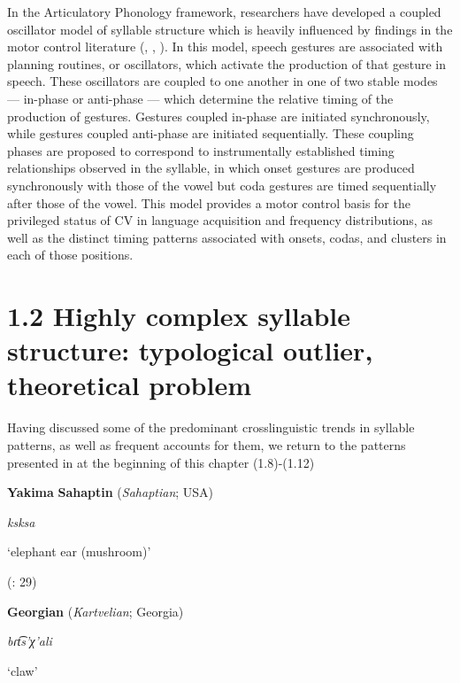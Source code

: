   In the Articulatory Phonology framework, researchers have developed a coupled oscillator model of syllable structure which is heavily influenced by findings in the motor control literature (\citealt{NamSaltzman2003}, \citealt{GoldsteinEtAl2006}, \citealt{NamEtAl2009}). In this model, speech gestures are associated with planning routines, or oscillators, which activate the production of that gesture in speech. These oscillators are coupled to one another in one of two stable modes — in-phase or anti-phase — which determine the relative timing of the production of gestures. Gestures coupled in-phase are initiated synchronously, while gestures coupled anti-phase are initiated sequentially. These coupling phases are proposed to correspond to instrumentally established timing relationships observed in the syllable, in which onset gestures are produced synchronously with those of the vowel but coda gestures are timed sequentially after those of the vowel. This model provides a motor control basis for the privileged status of CV in language acquisition and frequency distributions, as well as the distinct timing patterns associated with onsets, codas, and clusters in each of those positions.


\section{1.2 Highly complex syllable structure: typological outlier, theoretical problem}

  Having discussed some of the predominant crosslinguistic trends in syllable patterns, as well as frequent accounts for them, we return to the patterns presented in at the beginning of this chapter (1.8)-(1.12)



\ea\label{ex:(1.8)}
   \textbf{Yakima} \textbf{Sahaptin} (\textit{Sahaptian}; USA)



\textit{ksksa}



‘elephant ear (mushroom)’



(\citealt{HargusBeavert2006}: 29)
\z



\ea\label{ex:(1.9)}
   \textbf{Georgian} (\textit{Kartvelian}; Georgia)



\textit{bɾt͡s’χ’ali}



‘claw’



